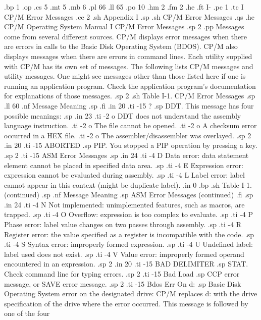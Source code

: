 .bp 1
.op
.cs 5
.mt 5
.mb 6
.pl 66
.ll 65
.po 10
.hm 2
.fm 2
.he 
.ft                                I-%
.pc 1
.tc I  CP/M Error Messages
.ce 2
.sh
Appendix I
.sp
.sh
CP/M Error Messages
.qs
.he CP/M Operating System Manual               I  CP/M Error Messages
.sp 2
.pp
Messages come from several different sources.  CP/M displays 
error messages when there are errors in calls to the Basic Disk 
Operating System (BDOS).  CP/M also displays messages when there 
are errors in command lines.  Each utility supplied with CP/M has 
its own set of messages.  The following lists CP/M messages and 
utility messages.  One might see messages other than those listed 
here if one is running an application program.  Check the 
application program's documentation for explanations of those 
messages.
.sp 2
.sh
                 Table I-1.  CP/M Error Messages
.sp
.ll 60
.nf
     Message        Meaning
.sp
.fi
.in 20
.ti -15
?
.sp
DDT.  This message has four possible meanings:
.sp
.in 23
.ti -2
o DDT does not understand the assembly language instruction.
.ti -2
o The file cannot be opened.
.ti -2
o A checksum error occurred in a HEX file.
.ti -2
o The assembler/disassembler was overlayed.
.sp 2
.in 20
.ti -15
ABORTED
.sp
PIP.  You stopped a PIP operation by pressing a key.
.sp 2
.ti -15
ASM Error Messages
.sp
.in 24
.ti -4
D   Data error:  data statement element cannot be placed in 
specified data area.
.sp
.ti -4
E   Expression error:  expression cannot be evaluated during 
assembly.
.sp
.ti -4
L   Label error:  label cannot appear in this context (might be 
duplicate label).
.in 0
.bp
.sh
                     Table I-1.  (continued)
.sp
.nf
     Message        Meaning
.sp   
     ASM Error Messages (continued)
.fi
.sp
.in 24
.ti -4
N   Not implemented:  unimplemented features, such as macros, are 
trapped.
.sp
.ti -4
O   Overflow:  expression is too complex to evaluate.
.sp
.ti -4
P   Phase error:  label value changes on two passes through 
assembly.
.sp
.ti -4
R   Register error:  the value specified as a register is 
incompatible with the code.
.sp
.ti -4
S   Syntax error:  improperly formed expression.
.sp
.ti -4
U   Undefined label:  label used does not exist.
.sp
.ti -4
V   Value error:  improperly formed operand encountered in an 
expression.
.sp 2
.in 20
.ti -15
BAD DELIMITER
.sp
STAT.  Check command line for typing errors.
.sp 2
.ti -15
Bad Load
.sp
CCP error message, or SAVE error message.
.sp 2
.ti -15
Bdos Err On d:
.sp
Basic Disk Operating System error on the designated drive:  CP/M 
replaces d: with the drive specification of the drive where the 
error occurred.  This message is followed by one of the four 
